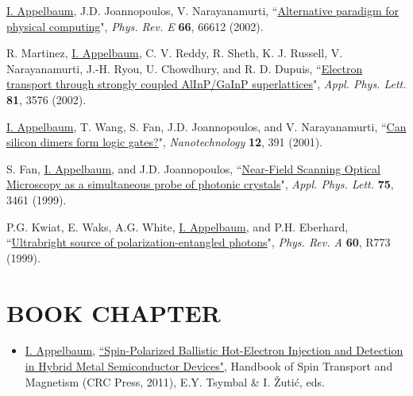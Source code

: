 \documentclass[paper=letter,fontsize=11pt]{scrartcl} %
\newcommand{\NewPart}[2]{\section*{\uppercase{#1} #2}}
\newcommand{\PaperEntry}[7]{
		\noindent #1, ``\href{#7}{#2}", \textit{#3} \textbf{#4}, #5 (#6).}
\newcommand{\ArxivEntry}[3]{
		\noindent #1, ``\href{http://arxiv.org/abs/#3}{#2}", \textit{{cond-mat/}#3}.}
\begin{document}
\begin{etaremune}
\item\PaperEntry{\underline{I. Appelbaum}, J.D. Joannopoulos, V. Narayanamurti}{Alternative paradigm for physical computing}{Phys. Rev. E}{66}{66612}{2002}{http://dx.doi.org/10.1103/PhysRevE.66.066612}

\item\PaperEntry{R. Martinez, \underline{I. Appelbaum}, C. V. Reddy, R. Sheth, K. J. Russell, V. Narayanamurti, J.-H. Ryou, U. Chowdhury, and R. D. Dupuis}{Electron transport through strongly coupled AlInP/GaInP superlattices}{Appl. Phys. Lett.}{81}{3576}{2002}{http://dx.doi.org/10.1063/1.1519350}

\item\PaperEntry{\underline{I. Appelbaum}, T. Wang, S. Fan, J.D. Joannopoulos, and V. Narayanamurti}{Can silicon dimers form logic gates?}{Nanotechnology}{12}{391}{2001}{http://dx.doi.org/10.1088/0957-4484/12/3/330}

\item\PaperEntry{S. Fan, \underline{I. Appelbaum}, and J.D. Joannopoulos}{Near-Field Scanning Optical Microscopy as a simultaneous probe of photonic crystals}%
{Appl. Phys. Lett.}{75}{3461}{1999}{http://dx.doi.org/10.1063/1.125296}

\item\PaperEntry{P.G. Kwiat, E. Waks, A.G. White, \underline{I. Appelbaum}, and P.H. Eberhard}{Ultrabright source of polarization-entangled photons}{Phys. Rev. A}{60}{R773}{1999}{http://dx.doi.org/10.1103/PhysRevA.60.R773}


\end{etaremune}



\NewPart{Book Chapter}{}
\begin{itemize}
\item \underline{I. Appelbaum}, \href{http://www.crcpress.com/product/isbn/9781439803776}{``Spin-Polarized Ballistic Hot-Electron Injection and Detection in Hybrid Metal Semiconductor Devices"}, Handbook of Spin Transport and Magnetism (CRC Press, 2011), E.Y. Tsymbal \& I. \v{Z}uti\'c, eds.
\end{itemize}
\end{document}
